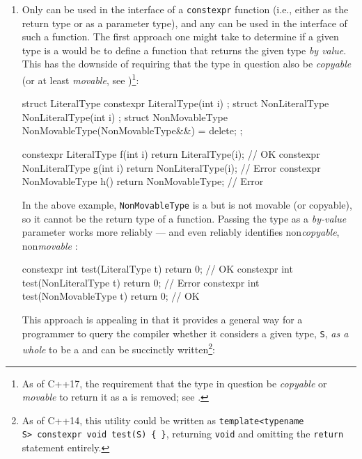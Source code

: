 \begin{enumerate}
\item{Only  can be used in the interface of a \lstinline!constexpr! function (i.e., either as the return type or as a parameter type), and any  can be used in the interface of such a function. The first approach one might take to determine if a given type is a  would be to define a function that returns the given type \emph{by value}. This has the downside of requiring that the type in question also be \emph{copyable} (or at least \emph{movable}, see )\cprotect\footnote{As of C++17, the requirement that the type in question be \emph{copyable} or \emph{movable} to return it as a  is removed; see .}:

\begin{emcppslisting}[emcppsbatch=e9]
struct LiteralType    { constexpr LiteralType(int i)    {}         };
struct NonLiteralType {           NonLiteralType(int i) {}         };
struct NonMovableType { NonMovableType(NonMovableType&&) = delete; };

constexpr LiteralType    f(int i) { return LiteralType(i);    }  // OK
constexpr NonLiteralType g(int i) { return NonLiteralType(i); }  // Error
constexpr NonMovableType h()      { return NonMovableType{};  }  // Error
\end{emcppslisting}


\noindent In the above example, \lstinline!NonMovableType! is a 
but is not movable (or copyable), so it cannot be the return type of a
function. Passing the type as a \emph{by-value} parameter works more
reliably --- and even reliably identifies non\emph{copyable},
non\emph{movable} :

\begin{emcppslisting}[emcppsbatch=e9]
constexpr int test(LiteralType t)    { return 0; } // OK
constexpr int test(NonLiteralType t) { return 0; } // Error
constexpr int test(NonMovableType t) { return 0; } // OK
\end{emcppslisting}

\noindent This approach is appealing in that it provides a general way for a
programmer to query the compiler whether it considers a given type,
\lstinline!S!, \emph{as a whole} to be a  and can be
succinctly written{\cprotect\footnote{As of C++14, this utility could be
written as
  \lstinline!template<typename S>!~\lstinline!constexpr!~\lstinline!void!~\lstinline!test(S)!~\lstinline!{!~\lstinline!}!,
  returning \lstinline!void! and omitting the \lstinline!return! statement
  entirely.}}:

}
\end{enumerate}
